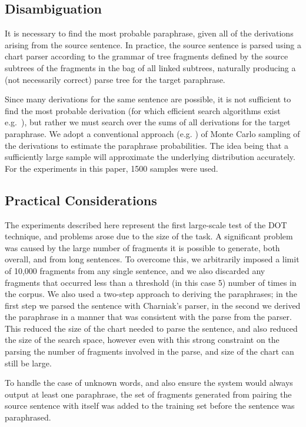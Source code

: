 \subsection{Disambiguation}

It is necessary to find the most probable paraphrase, given all of the derivations arising from
the source sentence. In practice, the source sentence is parsed using a chart parser according
to the grammar of tree fragments defined by the source subtrees of the fragments in the bag
of all linked subtrees, naturally producing a (not necessarily correct) parse tree for the target paraphrase.

Since many derivations for the same sentence are possible, it is not sufficient to find
the most probable derivation (for which efficient search algorithms exist e.g.~\cite{bod99beyond}), 
but rather we must search over the sums of all derivations for the target paraphrase.
We adopt a conventional approach (e.g. \cite{poutsma:98}) of Monte Carlo 
sampling of the derivations to estimate the paraphrase probabilities. The idea being that a sufficiently large sample will
approximate the underlying distribution accurately. For the experiments in this paper, 1500 samples were used.

\subsection{Practical Considerations}
\label{sec:practical}

The experiments described here represent the first large-scale test of the DOT technique,
and problems arose due to the size of the task. A significant problem was caused by the large
number of fragments it is possible to generate, both overall, and from long sentences.  To
overcome this, we arbitrarily imposed a limit of 10,000 fragments from any single sentence,
and we also discarded any fragments that occurred less than a threshold (in this case 5)
number of times in the corpus. 
We also used a two-step approach to deriving the
paraphrases; in the first step we parsed the sentence with Charniak's parser, in the second we
derived the paraphrase in a manner that was consistent with the parse from the parser.
This reduced the size of the chart needed to parse the sentence, and also reduced the size 
of the search space, however even with this strong constraint on the parsing the number of fragments involved
in the parse, and size of the chart can still be large.

To handle the case of unknown words, and also ensure the system would always output at least one
paraphrase, the set of fragments generated from pairing the source sentence with itself was
added to the training set before the sentence was paraphrased.

